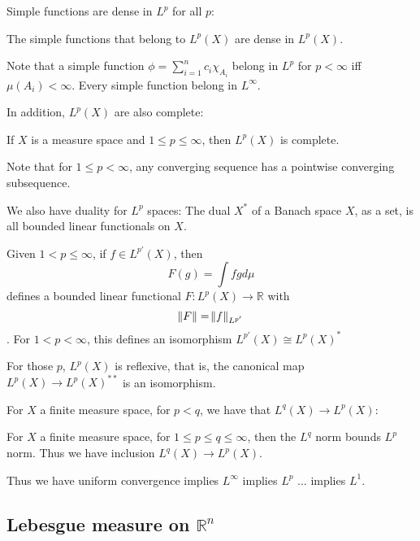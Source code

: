 \documentclass[main.tex]{subfiles}
\begin{document}
Simple functions are dense in $L^p$ for all $p$:

\begin{theorem}
The simple functions that belong to $L^p(X)$ are dense in $L^p(X)$.
\end{theorem}

Note that a simple function $\phi = \sum_{i=1} ^n c_i \chi_{A_i}$ belong in $L^p$ for $p < \infty$ iff $\mu(A_i) < \infty$. Every simple function belong in $L^\infty$.

In addition, $L^p(X)$ are also complete:

\begin{theorem}
If $X$ is a measure space and $1 \leq p \leq \infty$, then $L^p(X)$ is complete.
\end{theorem}

Note that for $1 \leq p < \infty$, any converging sequence has a pointwise converging subsequence.

We also have duality for $L^p$ spaces:
The dual $X^*$ of a Banach space $X$, as a set, is all bounded linear functionals on $X$.

\begin{theorem}
Given $1 < p \leq \infty$, if $f \in L^{p'}(X)$, then 
$$
F(g) = \int fg d\mu 
$$
defines a bounded linear functional $F: L^p(X) \rightarrow \mathbb{R}$ with 
$$
\norm{F} = \norm{f}_{L^{p'}}
$$.
For $1 < p < \infty$, this defines an isomorphism $L^{p'}(X) \cong L^p(X)^*$
\end{theorem}

\begin{corollary}
For those $p$, $L^p(X)$ is reflexive, that is, the canonical map $L^p(X) \rightarrow L^p(X)^{**}$ is an isomorphism.
\end{corollary}

For $X$ a finite measure space, for $p < q$, we have that $L^q(X) \xrightarrow{} L^p(X)$:

\begin{theorem}
For $X$ a finite measure space, for $1 \leq p \leq q \leq \infty$, then the $L^q$ norm bounds $L^p$ norm. Thus we have inclusion $L^q(X) \xrightarrow{} L^p(X)$. 
\end{theorem}

Thus we have uniform convergence implies $L^\infty$ implies $L^p$ ... implies $L^1$.

\subsection{Lebesgue measure on $\mathbb{R}^n$}
\end{document}
